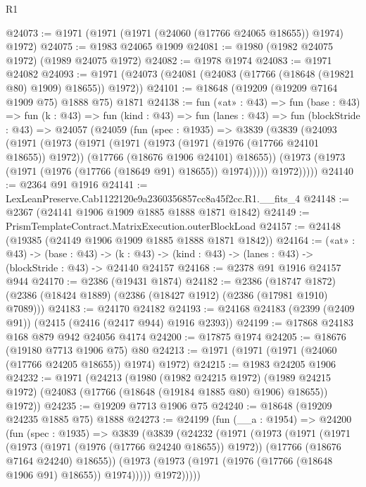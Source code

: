 \begin{lexlean}{R1}
\begin{coremodule}
@24073 := @1971 (@1971 (@1971 (@24060 (@17766 @24065 @18655)) @1974) @1972)
@24075 := @1983 @24065 @1909
@24081 := @1980 (@1982 @24075 @1972) (@1989 @24075 @1972)
@24082 := @1978 @1974
@24083 := @1971 @24082
@24093 := @1971 (@24073 (@24081 (@24083 (@17766 (@18648 (@19821 @80) @1909) @18655)) @1972))
@24101 := @18648 (@19209 (@19209 @7164 @1909 @75) @1888 @75) @1871
@24138 := fun («at» : @43) =>
  fun (base : @43) =>
  fun (k : @43) =>
  fun (kind : @43) =>
  fun (lanes : @43) =>
  fun (blockStride : @43) =>
  @24057
    (@24059
      (fun (spec : @1935) =>
      @3839
        (@3839
          (@24093
            (@1971
              (@1973
                (@1971
                  (@1971
                    (@1973 (@1971 (@1976 (@17766 @24101 @18655)) @1972))
                    (@17766 (@18676 @1906 @24101) @18655))
                  (@1973 (@1973 (@1971 (@1976 (@17766 (@18649 @91) @18655)) @1974)))))
              @1972)))))
@24140 := @2364 @91 @1916
@24141 := LexLeanPreserve.Cab1122120e9a2360356857cc8a45f2cc.R1.__fits_4
@24148 := @2367 (@24141 @1906 @1909 @1885 @1888 @1871 @1842)
@24149 := PrismTemplateContract.MatrixExecution.outerBlockLoad
@24157 := @24148 (@19385 (@24149 @1906 @1909 @1885 @1888 @1871 @1842))
@24164 := («at» : @43) ->
  (base : @43) -> (k : @43) -> (kind : @43) -> (lanes : @43) -> (blockStride : @43) -> @24140 @24157
@24168 := @2378 @91 @1916 @24157 @944
@24170 := @2386 (@19431 @1874)
@24182 := @2386
    (@18747 @1872)
    (@2386 (@18424 @1889) (@2386 (@18427 @1912) (@2386 (@17981 @1910) @7089)))
@24183 := @24170 @24182
@24193 := @24168 @24183 (@2399 (@2409 @91)) (@2415 (@2416 (@2417 @944) @1916 @2393))
@24199 := @17868 @24183 @168 @879 @942 @24056 @4174
@24200 := @17875 @1974
@24205 := @18676 (@19180 @7713 @1906 @75) @80
@24213 := @1971 (@1971 (@1971 (@24060 (@17766 @24205 @18655)) @1974) @1972)
@24215 := @1983 @24205 @1906
@24232 := @1971
    (@24213
      (@1980
        (@1982 @24215 @1972)
        (@1989 @24215 @1972)
        (@24083 (@17766 (@18648 (@19184 @1885 @80) @1906) @18655))
        @1972))
@24235 := @19209 @7713 @1906 @75
@24240 := @18648 (@19209 @24235 @1885 @75) @1888
@24273 := @24199
    (fun (__a : @1954) =>
    @24200
      (fun (spec : @1935) =>
      @3839
        (@3839
          (@24232
            (@1971
              (@1973
                (@1971
                  (@1971
                    (@1973 (@1971 (@1976 (@17766 @24240 @18655)) @1972))
                    (@17766 (@18676 @7164 @24240) @18655))
                  (@1973 (@1973 (@1971 (@1976 (@17766 (@18648 @1906 @91) @18655)) @1974)))))
              @1972)))))

\end{coremodule}
\end{lexlean}
